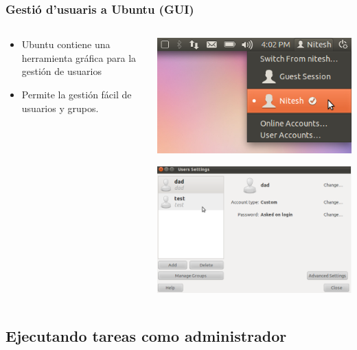 \documentclass[colorlinks,10pt]{beamer}
\begin{document}
\begin{frame}
  \frametitle{Gestió d'usuaris a Ubuntu (GUI)}
  \begin{columns}
    \begin{column}{0.5\textwidth}
      \begin{itemize}
      \item Ubuntu contiene una herramienta gráfica para la gestión de usuarios
      \item Permite la gestión fácil de usuarios y grupos. 
      \end{itemize}
    \end{column}
    \begin{column}{0.5\textwidth}
      \begin{center}
        \includegraphics[width=0.5\columnwidth]{figs/ubntuusermenu}
      \end{center}

      \begin{center}
        \includegraphics[width=0.7\columnwidth]{figs/users}
      \end{center}
    \end{column}

  \end{columns}

\end{frame}
 


\subsection{Ejecutando  tareas como  administrador}
\end{document}
